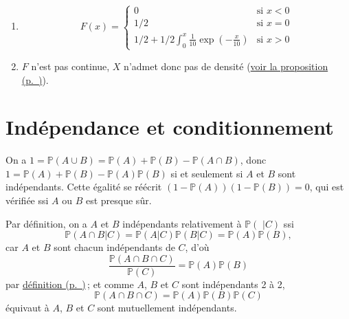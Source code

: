 \label{I-answer-ex.pluie}

\begin{enumerate}
\def\labelenumi{\arabic{enumi}.}
\item
  \[F(x) = \left\{ \begin{array}{ll}
  0 & \text{si } x < 0 \\
  1/2 & \text{si } x = 0 \\ 
  1/2 + 1/2 \int_0^x \frac{1}{10}\exp\left(-\frac{x}{10}\right) & \text{si } x > 0 
  \end{array} \right.\]
\item
  \(F\) n'est pas continue, \(X\) n'admet donc pas de densité
  (\protect\hyperref[I-fdr-va-dens]{voir la
  proposition (p.~\pageref*{I-fdr-va-dens})}).
\end{enumerate}

\section{Indépendance et
conditionnement}\label{I-induxe9pendance-et-conditionnement-1}

\label{I-answer-ic-1}
On a
\(1 = \mathbb{P}(A\cup B) = \mathbb{P}(A) + \mathbb{P}(B) - \mathbb{P}(A\cap B)\),
donc \(1 = \mathbb{P}(A) + \mathbb{P}(B) - \mathbb{P}(A)\mathbb{P}(B)\)
si et seulement si \(A\) et \(B\) sont indépendants. Cette égalité se
réécrit \((1-\mathbb{P}(A))(1-\mathbb{P}(B))=0\), qui est vérifiée ssi
\(A\) ou \(B\) est presque sûr.

\label{I-answer-ic-2}
Par définition, on a \(A\) et \(B\) indépendants relativement à
\(\mathbb{P}(\,\,|C)\) ssi
\[\mathbb{P}(A\cap B |C) = \mathbb{P}(A|C)\mathbb{P}(B|C) = \mathbb{P}(A)\mathbb{P}(B),\]
car \(A\) et \(B\) sont chacun indépendants de \(C\), d'où
\[\frac{\mathbb{P}(A\cap B \cap C)}{\mathbb{P}(C)} = \mathbb{P}(A)\mathbb{P}(B)\]
par
\protect\hyperref[I-defprobacond]{définition (p.~\pageref*{I-defprobacond})}\,;
et comme \(A\), \(B\) et \(C\) sont indépendants 2 à 2,
\[\mathbb{P}(A\cap B \cap C) = \mathbb{P}(A)\mathbb{P}(B)\mathbb{P}(C)\]
équivaut à \(A\), \(B\) et \(C\) sont mutuellement indépendants.

